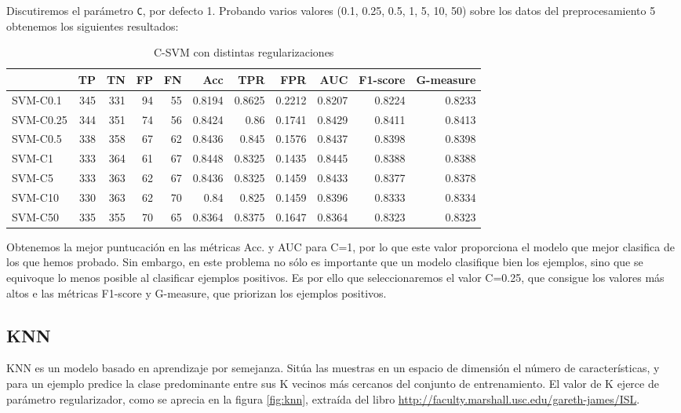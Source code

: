 \documentclass{article}
\begin{document}
Discutiremos el parámetro \texttt{C}, por defecto 1. Probando varios
valores (0.1, 0.25, 0.5, 1, 5, 10, 50) sobre los datos del
preprocesamiento 5 obtenemos los siguientes resultados:

\begin{table}[H]
\centering
\caption{C-SVM con distintas regularizaciones}
\label{tab:tuning-svm}
\begin{tabular}{|lrrrrrrrrrr|}
\hline
 & TP & TN & FP & FN & Acc & TPR & FPR & AUC & F1-score & G-measure\\ \hline
SVM-C0.1 & 345 & 331 & 94 & 55 & 0.8194 & 0.8625 & 0.2212 & 0.8207 & 0.8224 & 0.8233\\
SVM-C0.25 & 344 & 351 & 74 & 56 & 0.8424 & 0.86 & 0.1741 & 0.8429 & 0.8411 & 0.8413\\
SVM-C0.5 & 338 & 358 & 67 & 62 & 0.8436 & 0.845 & 0.1576 & 0.8437 & 0.8398 & 0.8398\\
SVM-C1 & 333 & 364 & 61 & 67 & 0.8448 & 0.8325 & 0.1435 & 0.8445 & 0.8388 & 0.8388\\
SVM-C5 & 333 & 363 & 62 & 67 & 0.8436 & 0.8325 & 0.1459 & 0.8433 & 0.8377 & 0.8378\\
SVM-C10 & 330 & 363 & 62 & 70 & 0.84 & 0.825 & 0.1459 & 0.8396 & 0.8333 & 0.8334\\
SVM-C50 & 335 & 355 & 70 & 65 & 0.8364 & 0.8375 & 0.1647 & 0.8364 & 0.8323 & 0.8323\\
\hline
\end{tabular}
\end{table}

Obtenemos la mejor puntucación en las métricas Acc. y AUC para C=1,
por lo que este valor proporciona el modelo que mejor clasifica de los
que hemos probado. Sin embargo, en este problema no sólo es importante
que un modelo clasifique bien los ejemplos, sino que se equivoque lo
menos posible al clasificar ejemplos positivos. Es por ello que
seleccionaremos el valor C=0.25, que consigue los valores más altos e
las métricas F1-score y G-measure, que priorizan los ejemplos
positivos.

\subsection{KNN}

KNN es un modelo basado en aprendizaje por semejanza. Sitúa las
muestras en un espacio de dimensión el número de características, y
para un ejemplo predice la clase predominante entre sus K vecinos más
cercanos del conjunto de entrenamiento. El valor de K ejerce de
parámetro regularizador, como se aprecia en la figura \ref{fig:knn},
extraída del libro
\href{http://faculty.marshall.usc.edu/gareth-james/ISL}{http://faculty.marshall.usc.edu/gareth-james/ISL}.
\end{document}
